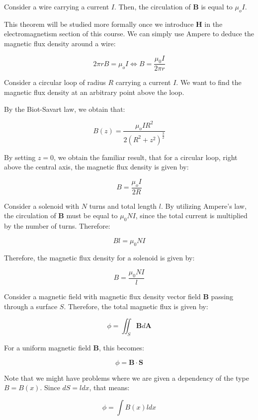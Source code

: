 \documentclass{article}
\begin{document}
\begin{theorem}
    Consider a wire carrying a current $I$. Then, the circulation of $\mathbf{B}$ is equal to $\mu_oI$. 
\end{theorem}

This theorem will be studied more formally once we introduce $\mathbf{H}$ in the electromagnetism section of this course. We can simply use Ampere to deduce the magnetic flux density around a wire:

\[ 2\pi rB = \mu_oI \iff B = \frac{\mu_0I}{2\pi r} \]

\begin{example}
    Consider a circular loop of radius $R$ carrying a current $I$. We want to find the magnetic flux density at an arbitrary point above the loop.

    By the Biot-Savart law, we obtain that:

    \[ B(z) = \frac{\mu_oIR^2}{2\left(R^2 + z^2\right)^{\frac{3}{2}}} \]

    By setting $z = 0$, we obtain the familiar result, that for a circular loop, right above the central axis, the magnetic flux density is given by:

    \[ B = \frac{\mu_oI}{2R} \]
\end{example}

\begin{example}
    Consider a solenoid with $N$ turns and total length $l$. By utilizing Ampere's law, the circulation of $\mathbf{B}$ must be equal to $\mu_0NI$, since the total current is multiplied by the number of turns. Therefore:

    \[ Bl = \mu_0NI \]

    Therefore, the magnetic flux density for a solenoid is given by:

    \[ B = \frac{\mu_0NI}{l} \]
\end{example}

\begin{definition}
    Consider a magnetic field with magnetic flux density vector field $\mathbf{B}$ passing through a surface $S$. Therefore, the total magnetic flux is given by:

    \[ \phi = \iint_S \mathbf{B}d\mathbf{A} \]

    For a uniform magnetic field $\mathbf{B}$, this becomes:

    \[ \phi = \mathbf{B} \cdot \mathbf{S} \]

    Note that we might have problems where we are given a dependency of the type $B = B(x)$. Since $dS = ldx$, that means:

    \[ \phi = \int B(x)ldx \]
\end{definition}
\end{document}

